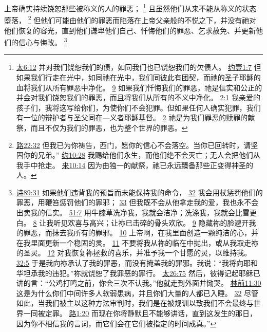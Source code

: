 \documentclass[12pt, a4paper, oneside]{ctexart}
\newcounter{parnum}[section]
\newcommand{\N}{%
   \noindent\refstepcounter{parnum}%
    \makebox[\parindent][l]{\textbf{\arabic{parnum}.}}}
\begin{document}
\N 上帝确实持续饶恕那些被称义的人的罪恶；
	\footnote {
		\href{https://biblehub.com/matthew/6-12.htm}{太6:12} 并对我们饶恕我们的债，如同我们也已饶恕我们的欠债人。
		\href{https://biblehub.com/1_john/1-7.htm}{约壹1:7} 但如果我们行走在光中，如同祂在光中，我们同彼此有团契，而祂的圣子耶稣的血将我们从所有罪恶中净化。
		\href{https://biblehub.com/1_john/1-9.htm}{9} 如果我们忏悔我们的罪恶，祂是信实和公正的并会对我们饶恕我们的罪恶，而且将我们从所有的不义中净化。
		\href{https://biblehub.com/1_john/2-1.htm}{2:1} 我亲爱的孩子们，我将这写给你们，为使你们不会犯罪。但如果任何人确实犯罪，我们有一位的辩护者与圣父同在---义者耶稣基督。
		\href{https://biblehub.com/1_john/2-2.htm}{2} 祂是为我们罪恶的赎罪的献祭，而且不仅为我们的罪恶，也为整个世界的罪恶。
	}
	且虽然他们从来不能从称义的状态堕落，
	\footnote {
		\href{https://biblehub.com/luke/22-32.htm}{路22:32} 但我已为你祷告，西门，愿你的信心不会落空。当你已回转时，请坚固你的兄弟。”
		\href{https://biblehub.com/john/10-28.htm}{约10:28} 我赐给他们永生，而他们绝不会灭亡；无人会把他们从我手中抢走。
		\href{https://biblehub.com/hebrews/10-14.htm}{来10:14} 因为由独一的献祭，祂已永远臻备那些正变得神圣的人。
	}
	但他们可能由他们的罪恶而陷落在上帝父亲般的不悦之下，并没有祂对他们恢复的容光，直到他们谦卑他们自己、忏悔他们的罪恶、乞求赦免、并更新他们的信心与悔改。
	\footnote {
		\href{https://biblehub.com/psalms/89-31.htm}{诗89:31} 如果他们违背我的预旨而未能保持我的命令，
		\href{https://biblehub.com/psalms/89-32.htm}{32} 我会用杖惩罚他们的罪恶，用鞭笞惩罚他们的罪邪；
		\href{https://biblehub.com/psalms/89-33.htm}{33} 但我既不会从他拿走我的爱，我也永不会出卖我的信实。
		\href{https://biblehub.com/psalms/51-7.htm}{51:7} 用牛膝草洗净我，我就会洁净；洗涤我，我就会比雪更白。
		\href{https://biblehub.com/psalms/51-8.htm}{8} 让我听见欢喜与高兴；让祢已击碎的骨头欢欣。
		\href{https://biblehub.com/psalms/51-9.htm}{9} 隐藏祢的脸避开我的罪恶，而抹去我所有的罪邪。
		\href{https://biblehub.com/psalms/51-10.htm}{10} 上帝啊，在我里面创造一颗纯洁的心，并在我里面更新一个稳固的灵。
		\href{https://biblehub.com/psalms/51-11.htm}{11} 不要将我从祢的临在中抛出，或从我取走祢的圣灵。
		\href{https://biblehub.com/psalms/51-12.htm}{12} 对我恢复祢拯救的喜乐，并准予我一个甘愿的灵，以维持我。
		\href{https://biblehub.com/psalms/32-5.htm}{32:5} 于是我向祢承认了我的罪恶，而没有掩盖我的罪邪。我说：“我将向耶和华坦承我的违犯。”祢就饶恕了我罪恶的罪行。
		\href{https://biblehub.com/matthew/26-75.htm}{太26:75} 然后，彼得记起耶稣已讲的言：“公鸡打鸣之前，你会三次不认我。”他就走到外面并恸哭。
		\href{https://biblehub.com/1_corinthians/11-30.htm}{林前11:30} 这是为什么你们中间许多人软弱患病，并且你们大量的人都已入睡。
		\href{https://biblehub.com/1_corinthians/11-32.htm}{32} 尽管如此，当我们被主以这种方法审判时，我们是在被规训以致我们不会最终与世界一同被定罪。
		\href{https://biblehub.com/luke/1-20.htm}{路1:20} 而现在你将静默且不能够讲话，直到这发生的那日，因为你不相信我的言词，而它们会在它们被指定的时间成真。”
	}
\end{document}
